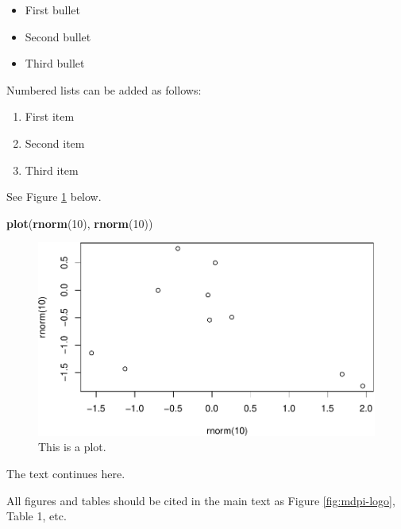 \documentclass[water,article,submit,moreauthors,pdftex]{mdpi}
\newenvironment{Shaded}{\begin{snugshade}}{\end{snugshade}}
\newcommand{\DecValTok}[1]{\textcolor[rgb]{0.00,0.00,0.81}{#1}}
\newcommand{\KeywordTok}[1]{\textcolor[rgb]{0.13,0.29,0.53}{\textbf{#1}}}
\newcommand{\NormalTok}[1]{#1}
\providecommand{\tightlist}{%
  \setlength{\itemsep}{0pt}\setlength{\parskip}{0pt}}
\begin{document}
\begin{itemize}
\tightlist
\item
  First bullet
\item
  Second bullet
\item
  Third bullet
\end{itemize}

Numbered lists can be added as follows:

\begin{enumerate}
\def\labelenumi{\arabic{enumi}.}
\tightlist
\item
  First item
\item
  Second item
\item
  Third item
\end{enumerate}

See Figure \ref{fig:random-plot} below.

\begin{Shaded}
\begin{Highlighting}[]
\KeywordTok{plot}\NormalTok{(}\KeywordTok{rnorm}\NormalTok{(}\DecValTok{10}\NormalTok{), }\KeywordTok{rnorm}\NormalTok{(}\DecValTok{10}\NormalTok{))}
\end{Highlighting}
\end{Shaded}

\begin{figure}

{\centering \includegraphics{Draft1_files/figure-latex/random-plot-1} 

}

\caption{This is a plot.}\label{fig:random-plot}
\end{figure}

The text continues here.

All figures and tables should be cited in the main text as Figure
\ref{fig:mdpi-logo}, Table 1, etc.
\end{document}
